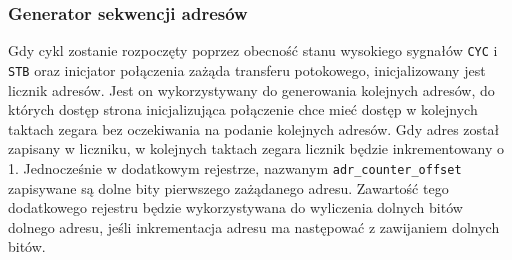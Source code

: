 \subsubsection{Generator sekwencji adresów}

Gdy cykl zostanie rozpoczęty poprzez obecność stanu wysokiego sygnałów \texttt{CYC} i \texttt{STB} oraz inicjator połączenia zażąda transferu potokowego, inicjalizowany jest licznik adresów. Jest on wykorzystywany do generowania kolejnych adresów, do których dostęp strona inicjalizująca połączenie chce mieć dostęp w kolejnych taktach zegara bez oczekiwania na podanie kolejnych adresów. Gdy adres został zapisany w liczniku, w kolejnych taktach zegara licznik będzie inkrementowany o 1.
Jednocześnie w dodatkowym rejestrze, nazwanym \texttt{adr_counter_offset} zapisywane są dolne bity pierwszego zażądanego adresu. Zawartość tego dodatkowego rejestru będzie wykorzystywana do wyliczenia dolnych bitów dolnego adresu, jeśli inkrementacja adresu ma następować z zawijaniem dolnych bitów.

